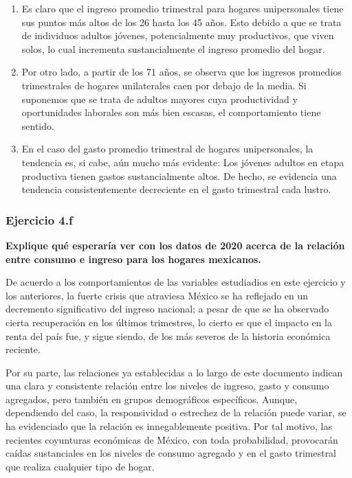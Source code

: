 \documentclass[
]{article}
\begin{document}
\begin{enumerate}
\def\labelenumi{\arabic{enumi}.}
\item
  Es claro que el ingreso promedio trimestral para hogares unipersonales
  tiene sus puntos más altos de los 26 hasta los 45 años. Esto debido a
  que se trata de individuos adultos jóvenes, potencialmente muy
  productivos, que viven solos, lo cual incrementa sustancialmente el
  ingreso promedio del hogar.
\item
  Por otro lado, a partir de los 71 años, se observa que los ingresos
  promedios trimestrales de hogares unilaterales caen por debajo de la
  media. Si suponemos que se trata de adultos mayores cuya productividad
  y oportunidades laborales son más bien escasas, el comportamiento
  tiene sentido.
\item
  En el caso del gasto promedio trimestral de hogares unipersonales, la
  tendencia es, si cabe, aún mucho más evidente: Los jóvenes adultos en
  etapa productiva tienen gastos sustancialmente altos. De hecho, se
  evidencia una tendencia consistentemente decreciente en el gasto
  trimestral cada lustro.
\end{enumerate}

\hypertarget{ejercicio-4.f}{%
\subsubsection{Ejercicio 4.f}\label{ejercicio-4.f}}

\textbf{Explique qué esperaría ver con los datos de 2020 acerca de la
relación entre consumo e ingreso para los hogares mexicanos.}

De acuerdo a los comportamientos de las variables estudiadios en este
ejercicio y los anteriores, la fuerte crisis que atraviesa México se ha
reflejado en un decremento significativo del ingreso nacional; a pesar
de que se ha observado cierta recuperación en los últimos trimestres, lo
cierto es que el impacto en la renta del país fue, y sigue siendo, de
los más severos de la historia económica reciente.

Por su parte, las relaciones ya establecidas a lo largo de este
documento indican una clara y consistente relación entre los niveles de
ingreso, gasto y consumo agregados, pero también en grupos demográficos
específicos. Aunque, dependiendo del caso, la responsividad o estrechez
de la relación puede variar, se ha evidenciado que la relación es
innegablemente positiva. Por tal motivo, las recientes coyunturas
económicas de México, con toda probabilidad, provocarán caídas
sustanciales en los niveles de consumo agregado y en el gasto trimestral
que realiza cualquier tipo de hogar.
\end{document}
